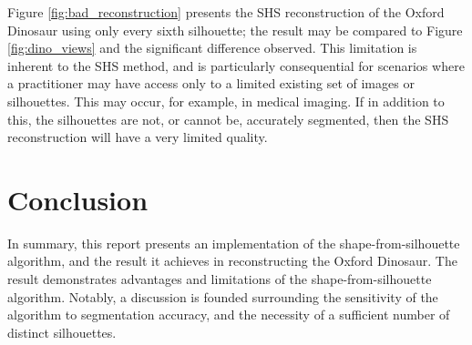 Figure \ref{fig:bad_reconstruction} presents the SHS reconstruction of the Oxford Dinosaur using only every sixth silhouette; the result may be compared to Figure \ref{fig:dino_views} and the significant difference observed. This limitation is inherent to the SHS method, and is particularly consequential for scenarios where a practitioner may have access only to a limited existing set of images or silhouettes. This may occur, for example, in medical imaging. If in addition to this, the silhouettes are not, or cannot be, accurately segmented, then the SHS reconstruction will have a very limited quality.

\section{Conclusion}

In summary, this report presents an implementation of the shape-from-silhouette algorithm, and the result it achieves in reconstructing the Oxford Dinosaur. The result demonstrates advantages and limitations of the shape-from-silhouette algorithm. Notably, a discussion is founded surrounding the sensitivity of the algorithm to segmentation accuracy, and the necessity of a sufficient number of distinct silhouettes.
